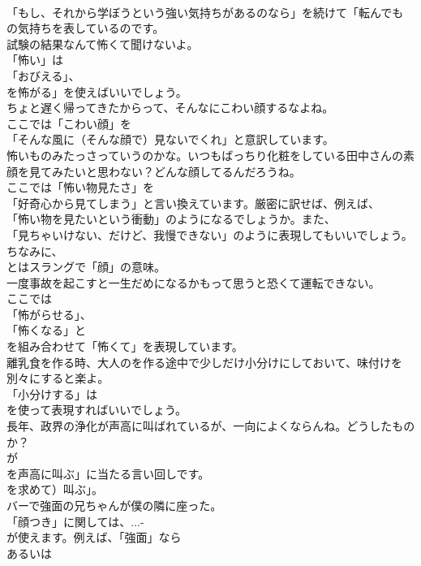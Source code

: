 \documentclass[8pt]{extreport}
\begin{document}
\begin{CJK}{UTF8}{min}
\\	「もし、それから学ぼうという強い気持ちがあるのなら」を続けて「転んでも 
\\	の気持ちを表しているのです。	
\\	試験の結果なんて怖くて聞けないよ。 
\\	「怖い」は
\\	「おびえる」、
\\	を怖がる」を使えばいいでしょう。	
\\	ちょと遅く帰ってきたからって、そんなにこわい顔するなよね。 
\\	ここでは「こわい顔」を
\\	「そんな風に（そんな顔で）見ないでくれ」と意訳しています。	
\\	怖いものみたっさっていうのかな。いつもばっちり化粧をしている田中さんの素顔を見てみたいと思わない？どんな顔してるんだろうね。 
\\	ここでは「怖い物見たさ」を
\\	「好奇心から見てしまう」と言い換えています。厳密に訳せば、例えば、
\\	「怖い物を見たいという衝動」のようになるでしょうか。また、
\\	「見ちゃいけない、だけど、我慢できない」のように表現してもいいでしょう。ちなみに、
\\	とはスラングで「顔」の意味。	
\\	一度事故を起こすと一生だめになるかもって思うと恐くて運転できない。 
\\	ここでは
\\	「怖がらせる」、
\\	「怖くなる」と
\\	を組み合わせて「怖くて」を表現しています。	
\\	離乳食を作る時、大人のを作る途中で少しだけ小分けにしておいて、味付けを別々にすると楽よ。 
\\	「小分けする」は 
\\	を使って表現すればいいでしょう。	
\\	長年、政界の浄化が声高に叫ばれているが、一向によくならんね。どうしたものか？ 
\\	が
\\	を声高に叫ぶ」に当たる言い回しです。
\\	を求めて）叫ぶ」。	
\\	バーで強面の兄ちゃんが僕の隣に座った。 
\\	「顔つき」に関しては、...-
\\	が使えます。例えば、「強面」なら
\\	あるいは

\end{CJK}
\end{document}
